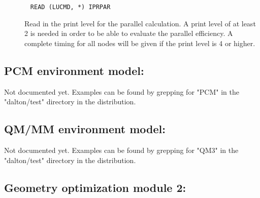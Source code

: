 \begin{description}
%
%
\item[]\verb| |\newline
\verb|READ (LUCMD, *) IPRPAR|

Read in the print level for the parallel calculation. A print level of
at least 2 is needed in order to be able to evaluate the
parallel efficiency. A complete
timing for all nodes will be
given if the print level is 4 or higher.
\end{description}

\subsection{PCM environment model: }
\label{sec:pcm}

Not documented yet. Examples can be found by grepping for "PCM" in the "dalton/test" directory in the distribution.

\subsection{QM/MM environment model: }
\label{sec:qm3}

Not documented yet. Examples can be found by grepping for "QM3" in the "dalton/test" directory in the distribution.


\subsection{Geometry optimization module 2: }
\label{sec:abawalk}

